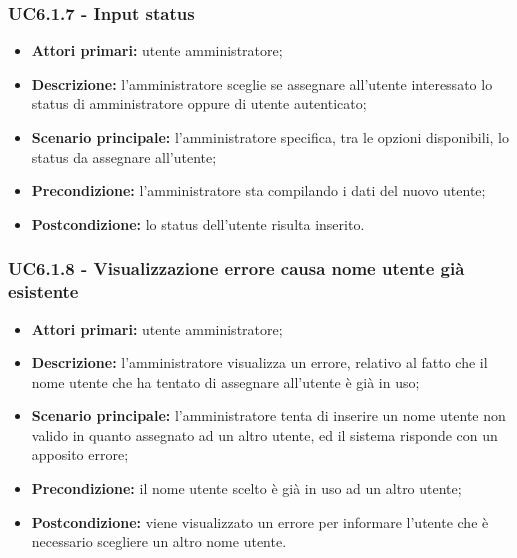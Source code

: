 \subsubsection{UC6.1.7 - Input status}
\begin{itemize}
	\item \textbf{Attori primari:} utente amministratore;
	\item \textbf{Descrizione:} l'amministratore sceglie se assegnare all'utente interessato lo status di amministratore oppure di utente autenticato;
	\item \textbf{Scenario principale:} l'amministratore specifica, tra le opzioni disponibili, lo status da assegnare all'utente;
	\item \textbf{Precondizione:} l'amministratore sta compilando i dati del nuovo utente;
	\item \textbf{Postcondizione:} lo status dell'utente risulta inserito.
\end{itemize}

\subsubsection{UC6.1.8 - Visualizzazione errore causa nome utente già esistente}
	\begin{itemize}
		\item \textbf{Attori primari:} utente amministratore;
		\item \textbf{Descrizione:} l'amministratore visualizza un errore, relativo al fatto che il nome utente che ha tentato di assegnare all'utente è già in uso;
		\item \textbf{Scenario principale:} l'amministratore tenta di inserire un nome utente non valido in quanto assegnato ad un altro utente, ed il sistema risponde con un apposito errore;
		\item \textbf{Precondizione:} il nome utente scelto è già in uso ad un altro utente;
		\item \textbf{Postcondizione:} viene visualizzato un errore per informare l'utente che è necessario scegliere un altro nome utente.
	\end{itemize}

